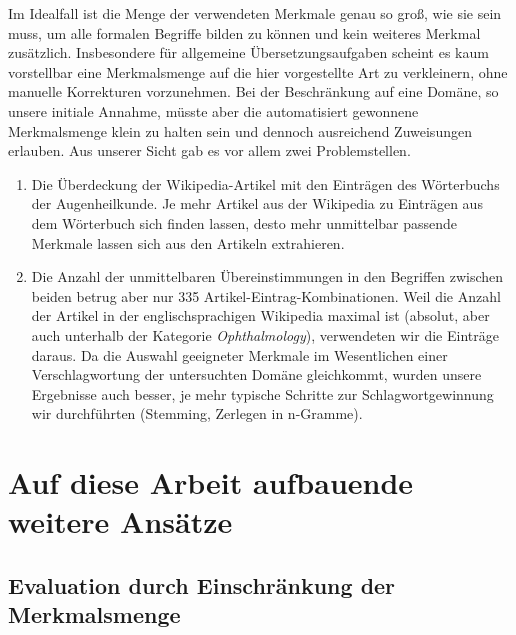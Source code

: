\documentclass[pagesize,DIV=calc,12pt,draft]{scrreprt}
\begin{document}
Im Idealfall ist die Menge der verwendeten Merkmale genau so groß, wie sie sein muss, um alle formalen Begriffe bilden zu können und kein weiteres Merkmal zusätzlich. 
Insbesondere für allgemeine Übersetzungsaufgaben scheint es kaum vorstellbar eine Merkmalsmenge auf die hier vorgestellte Art zu verkleinern, ohne manuelle Korrekturen vorzunehmen. 
Bei der Beschränkung auf eine Domäne, so unsere initiale Annahme, müsste aber die automatisiert gewonnene Merkmalsmenge klein zu halten sein und dennoch ausreichend Zuweisungen erlauben. 
Aus unserer Sicht gab es vor allem zwei Problemstellen. 
\begin{enumerate}
\item Die Überdeckung der Wikipedia-Artikel mit den Einträgen des Wörterbuchs der Augenheilkunde. 
Je mehr Artikel aus der Wikipedia zu Einträgen aus dem Wörterbuch sich finden lassen, desto mehr unmittelbar passende Merkmale lassen sich aus den Artikeln extrahieren. 
\item Die Anzahl der unmittelbaren Übereinstimmungen in den Begriffen zwischen beiden betrug aber nur 335 Artikel-Eintrag-Kombinationen. 
Weil die Anzahl der Artikel in der englischsprachigen Wikipedia maximal ist (absolut, aber auch unterhalb der Kategorie \emph{Ophthalmology}), verwendeten wir die Einträge daraus. 
Da die Auswahl geeigneter Merkmale im Wesentlichen einer Verschlagwortung der untersuchten Domäne gleichkommt, wurden unsere Ergebnisse auch besser, je mehr typische Schritte zur Schlagwortgewinnung wir durchführten (Stemming, Zerlegen in n-Gramme). 
\end{enumerate}

\section{Auf diese Arbeit aufbauende weitere Ansätze}
\subsection{Evaluation durch Einschränkung der Merkmalsmenge}
\end{document}
